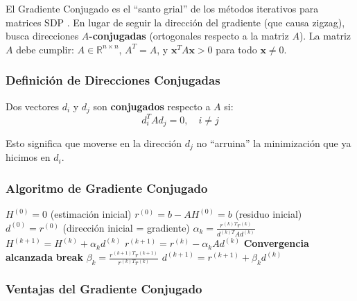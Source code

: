 \documentclass[11pt,letterpaper]{article}
\begin{document}
El Gradiente Conjugado es el ``santo grial'' de los métodos iterativos para matrices SDP \cite{Shewchuk}. En lugar de seguir la dirección del gradiente (que causa zigzag), busca direcciones \textbf{$A$-conjugadas} (ortogonales respecto a la matriz $A$). La matriz $A$ debe cumplir: $A \in \mathbb{R}^{n \times n}$, $A^T = A$, y $\mathbf{x}^T A \mathbf{x} > 0$ para todo $\mathbf{x} \neq 0$.

\subsubsection{Definición de Direcciones Conjugadas}

Dos vectores $d_i$ y $d_j$ son \textbf{conjugados} respecto a $A$ si:
\[
d_i^T A d_j = 0, \quad i \neq j
\]

Esto significa que moverse en la dirección $d_j$ no ``arruina'' la minimización que ya hicimos en $d_i$.

\subsubsection{Algoritmo de Gradiente Conjugado}

\begin{algorithm}[H]
\caption{Gradiente Conjugado para $AH = b$}
\begin{algorithmic}[1]
\STATE $H^{(0)} = 0$ (estimación inicial)
\STATE $r^{(0)} = b - A H^{(0)} = b$ (residuo inicial)
\STATE $d^{(0)} = r^{(0)}$ (dirección inicial = gradiente)
    \STATE $\alpha_k = \frac{r^{(k)T} r^{(k)}}{d^{(k)T} A d^{(k)}}$ 
    \STATE $H^{(k+1)} = H^{(k)} + \alpha_k d^{(k)}$ 
    \STATE $r^{(k+1)} = r^{(k)} - \alpha_k A d^{(k)}$ 
        \STATE \textbf{Convergencia alcanzada}
        \STATE \textbf{break}
    \ENDIF
    \STATE $\beta_k = \frac{r^{(k+1)T} r^{(k+1)}}{r^{(k)T} r^{(k)}}$ 
    \STATE $d^{(k+1)} = r^{(k+1)} + \beta_k d^{(k)}$ 
\ENDFOR
\end{algorithmic}
\end{algorithm}

\subsubsection{Ventajas del Gradiente Conjugado}
\end{document}
